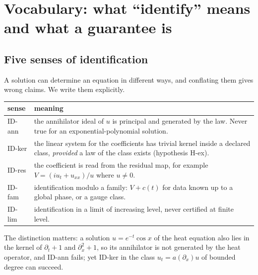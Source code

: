 \section{Vocabulary: what ``identify'' means and what a guarantee is}\label{sec:contract}
\subsection{Five senses of identification}
A solution can determine an equation in different ways, and conflating them gives wrong claims. We write them explicitly.
\begin{center}\small
\begin{tabular}{@{}lp{9cm}@{}}
\toprule
sense & meaning\\
\midrule
ID-ann & the annihilator ideal of $u$ is principal and generated by the law. Never true for an exponential-polynomial solution.\\
ID-ker & the linear system for the coefficients has trivial kernel inside a declared class, \emph{provided} a law of the class exists (hypothesis H-ex).\\
ID-res & the coefficient is read from the residual map, for example $V=(iu_t+u_{xx})/u$ where $u\neq0$.\\
ID-fam & identification modulo a family: $V+c(t)$ for data known up to a global phase, or a gauge class.\\
ID-lim & identification in a limit of increasing level, never certified at finite level.\\
\bottomrule
\end{tabular}
\end{center}
The distinction matters: a solution $u=e^{-t}\cos x$ of the heat equation also lies in the kernel of $\partial_t+1$ and $\partial_x^2+1$, so its annihilator is
not generated by the heat operator, and ID-ann fails; yet ID-ker in the class $u_t=a(\partial_x)u$ of bounded degree can succeed.

